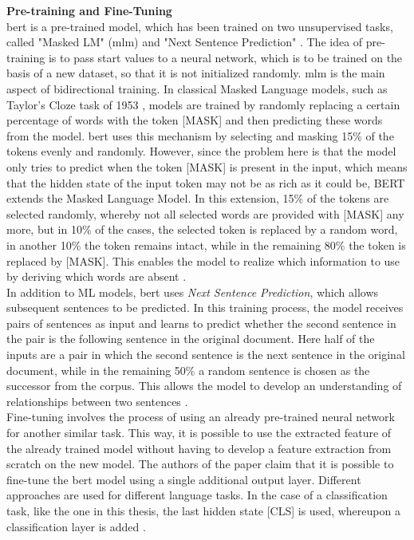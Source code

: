 \documentclass[a4paper, 11pt,titlepage,oneside,openany]{book}
\begin{document}
\noindent \textbf{Pre-training and Fine-Tuning}\\
\noindent \gls{bert} is a pre-trained model, which has been trained on two unsupervised tasks, called "Masked LM" (\gls{mlm}) and "Next Sentence Prediction" \cite{bert}. The idea of pre-training is to pass start values to a neural network, which is to be trained on the basis of a new dataset, so that it is not initialized randomly.
\newpage
\indent \gls{mlm} is the main aspect of bidirectional training. In classical Masked Language models, such as Taylor's Cloze task of 1953 \cite{cloze}, models are trained by randomly replacing a certain percentage of words with the token [MASK] and then predicting these words from the model. \gls{bert} uses this mechanism by selecting and masking 15\% of the tokens evenly and randomly. However, since the problem here is that the model only tries to predict when the token [MASK] is present in the input, which means that the hidden state of the input token may not be as rich as it could be, BERT extends the Masked Language Model. In this extension, 15\% of the tokens are selected randomly, whereby not all selected words are provided with [MASK] any more, but in 10\% of the cases, the selected token is replaced by a random word, in another 10\% the token remains intact, while in the remaining 80\% the token is replaced by [MASK]. This enables the model to realize which information to use by deriving which words are absent \cite{bert}.\\
\noindent In addition to ML models, \gls{bert} uses \textit{Next Sentence Prediction}, which allows subsequent sentences to be predicted. In this training process, the model receives pairs of sentences as input and learns to predict whether the second sentence in the pair is the following sentence in the original document. Here half of the inputs are a pair in which the second sentence is the next sentence in the original document, while in the remaining 50\% a random sentence is chosen as the successor from the corpus. This allows the model to develop an understanding of relationships between two sentences \cite{bert}. \\

Fine-tuning involves the process of using an already pre-trained neural network for another similar task. This way, it is possible to use the extracted feature of the already trained model without having to develop a feature extraction from scratch on the new model. The authors of the paper claim that it is possible to fine-tune the \gls{bert} model using a single additional output layer. Different approaches are used for different language tasks. In the case of a classification task, like the one in this thesis, the last hidden state [CLS] is used, whereupon a classification layer is added \cite{bert}. 
\end{document}
